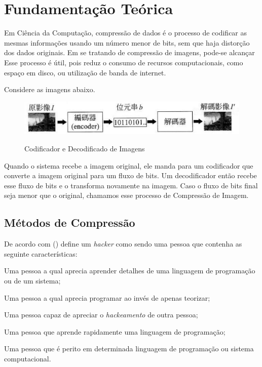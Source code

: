 \chapter{Fundamentação Teórica}
\label{c.fundamentacaoteorica}

Em Ciência da Computação, compressão de dados é o processo de codificar as mesmas informações usando um número menor de bits, sem que haja distorção dos dados originais. Em se tratando de compressão de imagens, pode-se alcançar Esse processo é útil, pois reduz o consumo de recursos computacionais, como espaço em disco, ou utilização de banda de internet.

Considere as imagens abaixo.

\begin{figure}[h]
\caption{\small Codificador e Decodificado de Imagens}
\centering
\includegraphics[scale=0.50]{figs/image_compression.jpg}
\label{f.imagecompressionbasics}
\end{figure}

Quando o sistema recebe a imagem original, ele manda para um codificador que converte a imagem original para um fluxo de bits. Um decodificador então recebe esse fluxo de bits e o transforma novamente na imagem. Caso o fluxo de bits final seja menor que o original, chamamos esse processo de Compressão de Imagem.



\section{Métodos de Compressão}
\label{s.metodos}



De acordo com  (\citeyear{hackerdictionary}) define um {\em hacker} como sendo uma pessoa que contenha as seguinte características:

\begin{alineas}
  \item Uma pessoa a qual aprecia aprender detalhes de uma linguagem de programação ou de um sistema;
  \item Uma pessoa a qual aprecia programar ao invés de apenas teorizar;
  \item Uma pessoa capaz de apreciar o {\em hackeamento} de outra pessoa;
  \item Uma pessoa que aprende rapidamente uma linguagem de programação;
  \item Uma pessoa que é perito em determinada linguagem de programação ou sistema computacional.
\end{alineas}



